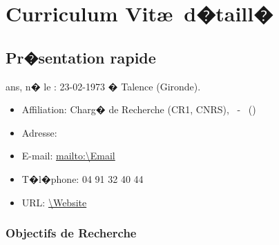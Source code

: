 \chapter{Curriculum Vit\ae\ d�taill�}
\section{Pr�sentation rapide}%
 ans, n� le : 23-02-1973 �  Talence (Gironde).  %

\begin{itemize}
\item Affiliation: Charg� de Recherche (CR1, CNRS), \Team\ - \Institute\ (\InstituteUMR)
\item Adresse: \Address
\item E-mail: \url{mailto:\Email}
\item T�l�phone: 04 91 32 40 44
\item URL: \url{\Website}
\end{itemize}


\subsection*{Objectifs de Recherche}

